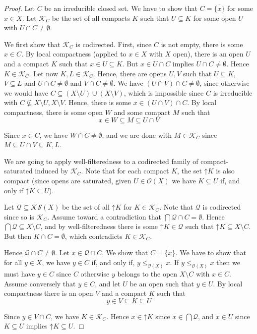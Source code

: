 \documentclass[%
  a4paper,
  UKenglish,
  cleveref,
  autoref,
  thm-restate,
  numberwithinsect,
]{lipics-v2021}
\newcommand\sle\subseteq
\newcommand\up{\mathord{\uparrow}}
\newcommand\clos[1]{\overline{#1}}	%
\newcommand\Open{\mathcal{O}}		%
\newcommand\K{\mathcal{K}}		%
\newcommand\Sat{\mathcal{S}}		%
\begin{document}
\begin{proof}
Let $C$ be an irreducible closed set.
We have to show that $C = \clos{\{x\}}$ for some $x \in X$.
%
Let $\K_C$ be the set of all compacts $K$ such that $U \sle K$
for some open $U$ with $U \cap C \neq \emptyset$.

We first show that $\K_C$ is codirected.
First, since $C$ is not empty, there is some $x \in C$.
By local compactness (applied to $x \in X$ with $X$ open),
there is an open $U$ and a compact $K$ such that $x \in U \sle K$.
But $x \in U \cap C$ implies $U \cap C \neq \emptyset$.
Hence $K \in \K_C$.
Let now $K, L \in \K_C$.
Hence, there are opens $U, V$ such that
$U \sle K$, $V \sle L$
and $U \cap C \neq \emptyset$
and $V \cap C \neq \emptyset$.
We have $(U \cap V) \cap C \neq \emptyset$,
since otherwise we would have $C \sle (X \setminus U) \cup (X \setminus V)$,
which is impossible since $C$ is irreducible
with $C \not\sle X \setminus U, X \setminus V$.
Hence, there is some $x \in (U \cap V) \cap C$.
By local compactness, there is some open $W$ and some compact $M$
such that
\[
  x \in W \sle M \sle U \cap V
\]

\noindent
Since $x \in C$, we have $W \cap C \neq \emptyset$,
and we are done with $M \in \K_C$ since $M \sle U \cap V \sle K, L$.

We are going to apply well-filteredness to a codirected
family of compact-saturated induced by $\K_C$.
Note that for each compact $K$, the set $\up K$ is also compact
(since opens are saturated, given $U \in \Open(X)$ we have
$K \sle U$ if, and only if $\up K \sle U$).

Let $\mathcal{Q} \sle \K\Sat(X)$ be the set of all $\up K$ for $K \in \K_C$.
Note that $\mathcal{Q}$ is codirected since so is $\K_C$.
Assume toward a contradiction that $\bigcap \mathcal{Q} \cap C = \emptyset$.
Hence $\bigcap \mathcal{Q} \sle X \setminus C$,
and by well-filteredness there is some $\up K \in \mathcal{Q}$
such that $\up K \sle X \setminus C$.
But then $K \cap C = \emptyset$,
which contradicts $K \in \K_C$.

Hence $\mathcal{Q} \cap C \neq \emptyset$.
Let $x \in \mathcal{Q} \cap C$.
We show that $C = \clos{\{x\}}$.
We have to show that for all $y \in X$,
we have $y \in C$ if, and only if, $y \leq_{\Open(X)} x$.
If $y \leq_{\Open(X)} x$ then
we must have $y \in C$ since $C$ 
otherwise $y$ belongs to the open $X \setminus C$ with $x \in C$.
Assume conversely that $y \in C$,
and let $U$ be an open such that $y \in U$.
By local compactness there is an open $V$ and a compact $K$ such that
\[
  y \in V \sle K \sle U
\]

\noindent
Since $y \in V \cap C$, we have $K \in \K_C$.
Hence $x \in \up K$ since $x \in \bigcap \mathcal{Q}$,
and $x \in U$ since $K \sle U$ implies $\up K \sle U$.
\end{proof}
\end{document}
